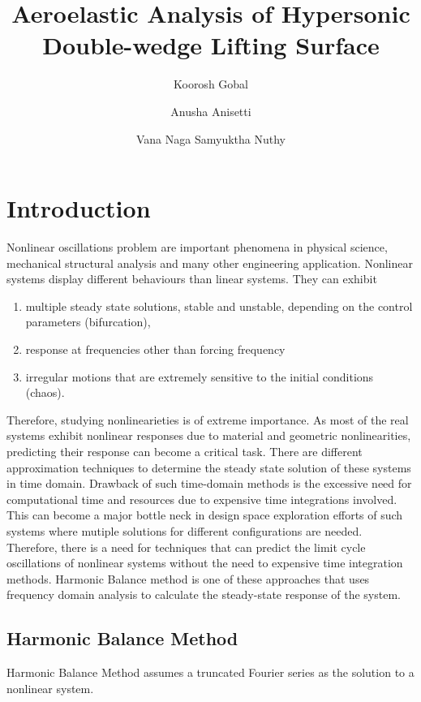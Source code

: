 \documentclass[12pt, a4paper]{extarticle}
\title{Aeroelastic Analysis of Hypersonic Double-wedge Lifting Surface}
\author[1]{Koorosh Gobal}
\author[1]{Anusha Anisetti}
\author[1]{Vana Naga Samyuktha Nuthy}
\affil[1]{Department of Mechanical and Materials Engineering, Wright State University}
\date{} %
\begin{document}
\maketitle

\abstract{}
\section{Introduction}
Nonlinear oscillations problem are important phenomena in physical science, mechanical structural analysis and many other engineering application. Nonlinear systems display different behaviours than linear systems. They can exhibit

\begin{enumerate}  
\item  multiple steady state solutions, stable and unstable, depending on the control parameters (bifurcation),
\item  response at frequencies other than forcing frequency
\item  irregular motions that are extremely sensitive to the initial conditions (chaos).
\end{enumerate}

Therefore, studying nonlinearieties is of extreme importance. As most of the real systems exhibit nonlinear responses due to material and geometric nonlinearities, predicting their response can become a critical task. There are different approximation techniques to determine the steady state solution of these systems in time domain. Drawback of such time-domain methods is the excessive need for computational time and resources due to expensive time integrations involved. This can become a major bottle neck in design space exploration efforts of such systems where mutiple solutions for different configurations are needed. Therefore, there is a need for techniques that can predict the limit cycle oscillations of nonlinear systems without the need to expensive time integration methods. Harmonic Balance method is one of these approaches that uses frequency domain analysis to calculate the steady-state response of the system. 

\subsection{Harmonic Balance Method}

Harmonic Balance Method assumes a truncated Fourier series as the solution to a nonlinear system. 
\end{document}
